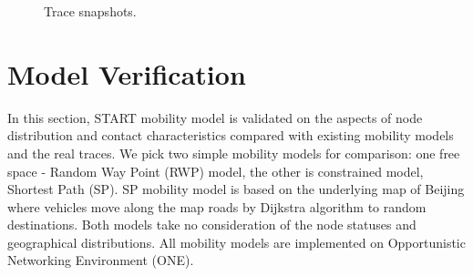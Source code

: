 \begin{figure}[!t]
\centering
{}
\caption{Trace snapshots.}\label{figure_trace_snapshots}
\end{figure}

\section{Model Verification}
\label{section_model_varification}
In this section, START mobility model is validated on the aspects of node distribution and contact characteristics compared with existing mobility models and the real traces. We pick two simple mobility models for comparison: one free space - Random Way Point (RWP) model, the other is constrained model, Shortest Path (SP).  SP mobility model is based on the underlying map of Beijing where vehicles move along the map roads by Dijkstra algorithm to random destinations. Both models take no consideration of the node statuses and geographical distributions. All mobility models are implemented on Opportunistic Networking Environment (ONE)\cite{KeranenOtt-155}.

